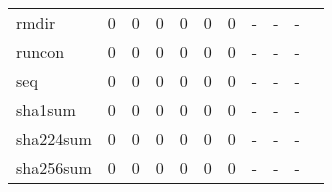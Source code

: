 \begin{longtable}{lp{1.2cm}p{1.2cm}p{1.2cm}p{1.2cm}p{1.2cm}p{1.2cm}p{1.2cm}p{1.2cm}p{1.2cm}p{1.2cm}}
rmdir     &                                     0 &                                                  0 &                                                  0 &                                                  0 &                                                  0 &                                                  0 &                                                  - &                                                  - &                                                  - \\
runcon    &                                     0 &                                                  0 &                                                  0 &                                                  0 &                                                  0 &                                                  0 &                                                  - &                                                  - &                                                  - \\
seq       &                                     0 &                                                  0 &                                                  0 &                                                  0 &                                                  0 &                                                  0 &                                                  - &                                                  - &                                                  - \\
sha1sum   &                                     0 &                                                  0 &                                                  0 &                                                  0 &                                                  0 &                                                  0 &                                                  - &                                                  - &                                                  - \\
sha224sum &                                     0 &                                                  0 &                                                  0 &                                                  0 &                                                  0 &                                                  0 &                                                  - &                                                  - &                                                  - \\
sha256sum &                                     0 &                                                  0 &                                                  0 &                                                  0 &                                                  0 &                                                  0 &                                                  - &                                                  - &                                                  - \\

\end{longtable}
